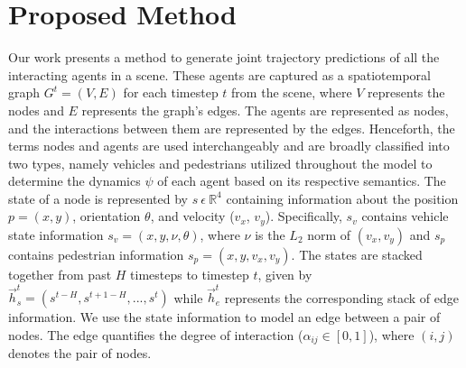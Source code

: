 \documentclass[letterpaper, 10 pt, conference]{ieeeconf}  %
\begin{document}
\section{Proposed Method}
Our work presents a method to generate joint trajectory predictions of all the interacting agents in a scene. These agents are captured as a spatiotemporal graph $G^t = (V,E)$ for each timestep $t$ from the scene, where $V$ represents the nodes and $E$ represents the graph's edges. The agents are represented as nodes, and the interactions between them are represented by the edges. 
Henceforth, the terms nodes and agents are used interchangeably and are broadly classified into two types, namely vehicles and pedestrians utilized throughout the model to determine the dynamics $\psi$ of each agent based on its respective semantics. The state of a node is represented by $s\ \epsilon\ \mathbb{R}^4$ containing information about the position $p = (x,y)$, orientation $\theta$, and velocity ($v_x$, $v_y$).
Specifically, $s_v$ contains vehicle state information $s_v = (x,y, \nu, \theta)$,  where $\nu$ is the $L_2$ norm of $(v_x, v_y)$ and $s_p$ contains pedestrian information $s_p= (x,y,v_x,v_y)$. The states are stacked together from past $H$ timesteps to timestep $t$, given by $\vec h^t_s = (s^{t-H}, s^{t+1-H}, ..., s^t)$ while $\vec h^t_e$ represents the corresponding stack of edge information. We use the state information to model an edge between a pair of nodes. The edge quantifies the degree of interaction ($\alpha_{ij} \in [0,1]$), where $(i,j)$ denotes the pair of nodes.  
\end{document}
